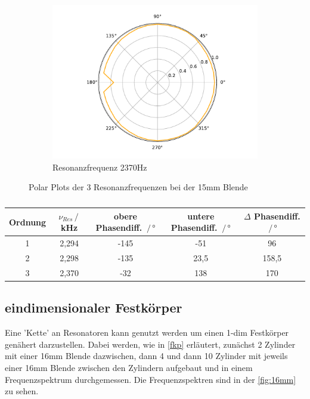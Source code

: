 \begin{figure}
\begin{subfigure}[b]{0.3\textwidth}
        \centering
        \includegraphics[width=\textwidth]{pic/polar_max_369.pdf}
        \caption{Resonanzfrequenz 2370Hz}
        \label{fig:polar3c}
    \end{subfigure}
    \caption{Polar Plots der 3 Resonanzfrequenzen bei der 15mm Blende}
    \label{fig:polar3}
\end{figure}

\begin{table}
    \caption{}
    \center
    \begin{tabular}{c| c c c c}
        \toprule
        Ordnung & $\nu_{Res}\,/\,$kHz & obere Phasendiff. $\,/\,°$ & untere Phasendiff. $\,/\,°$ & $\Delta$ Phasendiff. $\,/\,°$\\
        \midrule
        1 &2,294 &-145 &-51 &96 \\
        2 &2,298 &-135 &23,5 & 158,5\\
        3 &2,370 &-32 &138 & 170\\
        \bottomrule
    \end{tabular}
    \label{tab:phasen}
\end{table}


\subsection{eindimensionaler Festkörper}
Eine 'Kette' an Resonatoren kann genutzt werden um einen 1-dim Festkörper genähert darzustellen. Dabei werden, wie in \autoref{fkp} erläutert, zunächst 2 Zylinder
mit einer 16mm Blende dazwischen, dann 4 und dann 10 Zylinder mit jeweils einer 16mm Blende zwischen den Zylindern aufgebaut und in einem Frequenzspektrum durchgemessen.
Die Frequenzspektren sind in der \autoref{fig:16mm} zu sehen.


